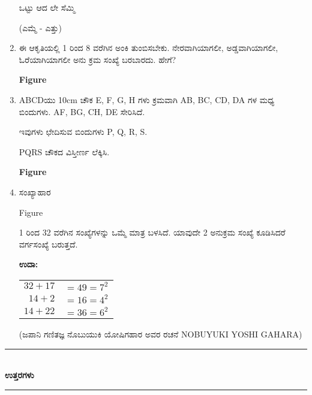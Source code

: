 \begin{enumerate}
ಒಟ್ಟು ಆದ ಲೇ ಸೆಮ್ಮಿ 

(ಎಮ್ಮೆ - ಎತ್ತು)

\item ಈ ಆಕೃತಿಯಲ್ಲಿ 1 ರಿಂದ 8 ವರೆಗಿನ ಅಂಕಿ ತುಂಬಿಸಬೇಕು. ನೇರವಾಗಿಯಾಗಲೀ, ಅಡ್ಡವಾಗಿಯಾಗಲೀ, ಓರೆಯಾಗಿಯಾಗಲೀ ಅನು ಕ್ರಮ ಸಂಖ್ಯೆ ಬರಬಾರದು. ಹೇಗೆ?

\begin{center}
{\bf Figure}
\end{center}

\item ABCDಯು 10cm ಚೌಕ E, F, G, H ಗಳು ಕ್ರಮವಾಗಿ AB, BC, CD, DA ಗಳ ಮಧ್ಯ ಬಿಂದುಗಳು. AF, BG, CH, DE ಸೇರಿಸಿದೆ. 

ಇವುಗಳು ಛೇದಿಸುವ ಬಿಂದುಗಳು P, Q, R, S. 

PQRS ಚೌಕದ ವಿಸ್ತೀರ್ಣ ಲೆಕ್ಕಿಸಿ.

\begin{center}
{\bf Figure}
\end{center}

\item ಸಂಖ್ಯಾಹಾರ

\begin{center}
Figure
\end{center}

1 ರಿಂದ 32 ವರೆಗಿನ ಸಂಖ್ಯೆಗಳನ್ನು ಒಮ್ಮೆ ಮಾತ್ರ ಬಳಸಿದೆ. ಯಾವುದೇ 2 ಅನುಕ್ರಮ ಸಂಖ್ಯೆ ಕೂಡಿಸಿದರೆ ವರ್ಗಸಂಖ್ಯೆ ಬರುತ್ತದೆ. 

{\bf ಉದಾ:}
\begin{tabular}[t]{rr}
$32 + 17$ & $= 49 = 7^{2}$\\
$14 + 2$ & $= 16 = 4^{2}$\\
$14 + 22$ & $= 36 = 6^{2}$
\end{tabular}

(ಜಪಾನಿ ಗಣಿತಜ್ಞ ನೊಬುಯುಕಿ ಯೋಷಿಗಹಾರ ಅವರ ರಚನೆ NOBUYUKI YOSHI GAHARA)
\end{enumerate}

\smallskip

\begin{center}
\rule{5cm}{1pt}\\[5pt]
{\Large\bfseries ಉತ್ತರಗಳು}\\[3pt]
\rule{5cm}{1pt}
\end{center}

